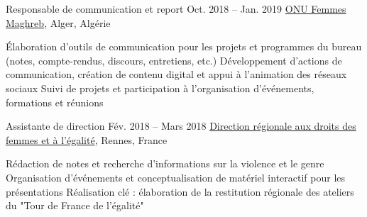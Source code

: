 \begin{joblist}

\item[Responsable de communication et report]{Oct. 2018 -- Jan. 2019 }     
	{
	\href{http://maghreb.unwomen.org/fr}{ONU Femmes Maghreb}, Alger, Algérie
	}     
	{
		\normalsize{
		\vspace{-0.5cm}
		\begin{itemize}
			  \iftbftiny \setlength\itemsep{-3pt} \fi
			  \cvitem[\checkmark] Élaboration d'outils de communication pour les projets et programmes du bureau (notes, compte-rendus, discours, entretiens, etc.)     
              \cvitem[\checkmark] Développement d'actions de communication, création de contenu digital et appui à l'animation des réseaux sociaux
			  \cvitem[\checkmark] Suivi de projets et participation à l'organisation d'événements, formations et réunions 
			  
			  
			  
		\end{itemize}      
		}
	}


\item[Assistante de direction]{Fév. 2018 -- Mars 2018 }     
	{
	\href{https://www.egalite-femmes-hommes.gouv.fr/le-secretariat-d-etat/organisation-du-ministere/services-territoriaux/annuaire-des-equipes-regionales-et-departementales/}{Direction régionale aux droits des femmes et à l'égalité}, Rennes, France
	}     
	{
		\normalsize{
		\iftbftiny \vspace{-0.5cm} \fi
		\begin{itemize}
			  \iftbftiny \setlength\itemsep{-3pt} \fi
			  \cvitem[\checkmark] Rédaction de notes et recherche d'informations sur la violence et le genre
			  \cvitem[\checkmark] Organisation d'événements et conceptualisation de matériel interactif pour les présentations
              \cvitem[\checkmark] Réalisation clé : élaboration de la restitution régionale des ateliers du "Tour de France de l’égalité"                                                            
			 

\end{itemize}}}
\end{joblist}
